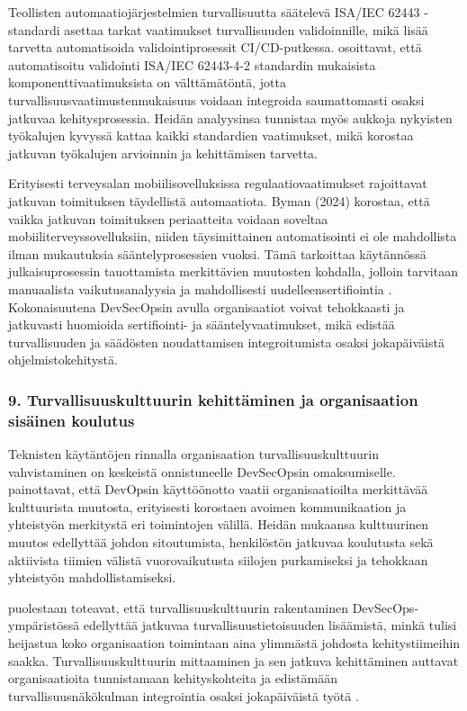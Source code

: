 \documentclass[bscthesis,finnish,oneside,biblatex]{uefcsthesis}
\begin{document}
    Teollisten automaatiojärjestelmien turvallisuutta säätelevä ISA/IEC 62443 -standardi asettaa tarkat vaatimukset turvallisuuden validoinnille, mikä lisää tarvetta automatisoida validointiprosessit CI/CD-putkessa. \cite{gottel2023_validating} osoittavat, että automatisoitu validointi ISA/IEC 62443-4-2 standardin mukaisista komponenttivaatimuksista on välttämätöntä, jotta turvallisuusvaatimustenmukaisuus voidaan integroida saumattomasti osaksi jatkuvaa kehitysprosessia. Heidän analyysinsa tunnistaa myös aukkoja nykyisten työkalujen kyvyssä kattaa kaikki standardien vaatimukset, mikä korostaa jatkuvan työkalujen arvioinnin ja kehittämisen tarvetta.

    Erityisesti terveysalan mobiilisovelluksissa regulaatiovaatimukset rajoittavat jatkuvan toimituksen täydellistä automaatiota. Byman (2024) korostaa, että vaikka jatkuvan toimituksen periaatteita voidaan soveltaa mobiiliterveyssovelluksiin, niiden täysimittainen automatisointi ei ole mahdollista ilman mukautuksia sääntelyprosessien vuoksi. Tämä tarkoittaa käytännössä julkaisuprosessin tauottamista merkittävien muutosten kohdalla, jolloin tarvitaan manuaalista vaikutusanalyysia ja mahdollisesti uudelleensertifiointia \cite{byman2024continuous}. Kokonaisuutena DevSecOpsin avulla organisaatiot voivat tehokkaasti ja jatkuvasti huomioida sertifiointi- ja sääntelyvaatimukset, mikä edistää turvallisuuden ja säädösten noudattamisen integroitumista osaksi jokapäiväistä ohjelmistokehitystä.

    \subsubsection{9. Turvallisuuskulttuurin kehittäminen ja organisaation sisäinen koulutus}

    Teknisten käytäntöjen rinnalla organisaation turvallisuuskulttuurin vahvistaminen on keskeistä onnistuneelle DevSecOpsin omaksumiselle. \cite{offerman2022_practices} painottavat, että DevOpsin käyttöönotto vaatii organisaatioilta merkittävää kulttuurista muutosta, erityisesti korostaen avoimen kommunikaation ja yhteistyön merkitystä eri toimintojen välillä. Heidän mukaansa kulttuurinen muutos edellyttää johdon sitoutumista, henkilöstön jatkuvaa koulutusta sekä aktiivista tiimien välistä vuorovaikutusta siilojen purkamiseksi ja tehokkaan yhteistyön mahdollistamiseksi.

    \cite{chung2024_devsecops} puolestaan toteavat, että turvallisuuskulttuurin rakentaminen DevSecOps-ympäristössä edellyttää jatkuvaa turvallisuustietoisuuden lisäämistä, minkä tulisi heijastua koko organisaation toimintaan aina ylimmästä johdosta kehitystiimeihin saakka. Turvallisuuskulttuurin mittaaminen ja sen jatkuva kehittäminen auttavat organisaatioita tunnistamaan kehityskohteita ja edistämään turvallisuusnäkökulman integrointia osaksi jokapäiväistä työtä \cite{chung2024_devsecops, saleem2023_survey}.
\end{document}
